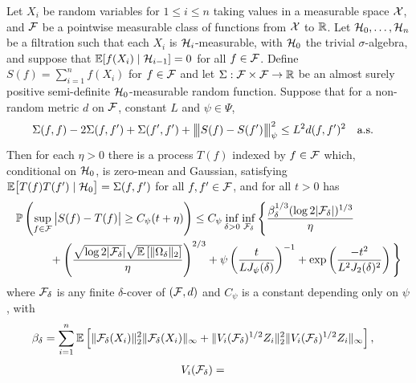 \begin{proposition}%
  \label{pro:emp_proc}

  Let $X_i$ be random variables for $1 \leq i \leq n$ taking values in a
  measurable space $\mathcal{X}$, and $\mathcal{F}$ be a pointwise measurable class of
  functions from $\mathcal{X}$ to $\mathbb{R}$. Let $\mathcal{H}_0, \ldots, \mathcal{H}_n$ be a filtration such
  that each $X_i$ is $\mathcal{H}_i$-measurable, with $\mathcal{H}_0$ the trivial
  $\sigma$-algebra, and suppose that $\mathbb{E}[f(X_i) \mid \mathcal{H}_{i-1}] = 0$ for all
  $f \in \mathcal{F}$. Define $S(f) = \sum_{i=1}^n f(X_i)$ for $f\in\mathcal{F}$ and let
  $\Sigma: \mathcal{F} \times \mathcal{F} \to \mathbb{R}$ be an almost surely positive semi-definite
  $\mathcal{H}_0$-measurable random function. Suppose that for a non-random
  metric $d$ on $\mathcal{F}$, constant $L$ and $\psi \in \Psi$,
  \begin{align}%
    \label{eq:emp_proc_var}
    \Sigma(f,f) - 2\Sigma(f,f') + \Sigma(f',f')
    + \bigvvvert S(f) - S(f') \bigvvvert_\psi^2
    &\leq L^2 d(f,f')^2 \quad \text{a.s.}
  \end{align}
  Then for each $\eta > 0$ there is a
  process $T(f)$ indexed by $f\in\mathcal{F}$
  which, conditional on $\mathcal{H}_0$, is zero-mean and Gaussian,
  satisfying
  $\mathbb{E}\big[ T(f) T(f') \mid \mathcal{H}_0 \big] = \Sigma(f,f')$
  for all $f, f' \in \mathcal{F}$, and for all $t > 0$ has
  \begin{align*}
    &\mathbb{P}\left(
      \sup_{f \in \mathcal{F}}
      \big| S(f) - T(f) \big|
      \geq C_\psi(t + \eta)
    \right)
    \leq
    C_\psi
    \inf_{\delta > 0}
    \inf_{\mathcal{F}_\delta}
    \Bigg\{
      \frac{\beta_\delta^{1/3} (\log 2 |\mathcal{F}_\delta|)^{1/3}}{\eta } \\
      &\qquad\quad+
      \left(\frac{\sqrt{\log 2 |\mathcal{F}_\delta|}
      \sqrt{\mathbb{E}\left[\|\Omega_\delta\|_2\right]}}{\eta }\right)^{2/3}
      + \psi\left(\frac{t}{L J_\psi(\delta)}\right)^{-1}
      + \exp\left(\frac{-t^2}{L^2 J_2(\delta)^2}\right)
    \Bigg\}
  \end{align*}
  where $\mathcal{F}_\delta$ is any finite $\delta$-cover of $(\mathcal{F},d)$
  and $C_\psi$ is a constant depending only on $\psi$, with
  \begin{align*}
    \beta_\delta
    &= \sum_{i=1}^n
    \mathbb{E}\left[ \|\mathcal{F}_\delta(X_i)\|^2_2\|\mathcal{F}_\delta(X_i)\|_\infty
      + \|V_i(\mathcal{F}_\delta)^{1/2}Z_i\|^2_2
    \|V_i(\mathcal{F}_\delta)^{1/2}Z_i\|_\infty \right],
  \end{align*}
  \vspace*{-6mm}
  \begin{align*}
    V_i(\cF_\delta)
    &=

\end{align*}
\end{proposition}
